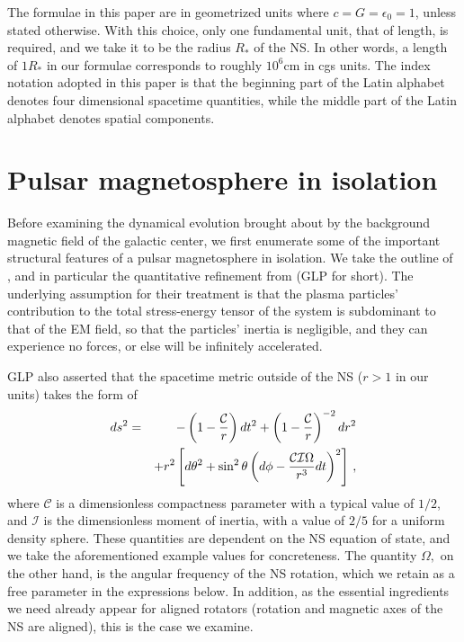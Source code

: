 \documentclass{aa}
\newcommand{\bea}{\begin{eqnarray}}
\newcommand{\eea}{\end{eqnarray}}
\begin{document}
The formulae in this paper are in geometrized units where $c=G=\epsilon_0=1$, unless stated otherwise. With this choice, only one fundamental unit, that of length, is required, and we take it to be the radius $R_*$ of the NS. In other words, a length of $1R_*$ in our formulae corresponds to roughly $10^6$cm in cgs units. The index notation adopted in this paper is that the beginning part of the Latin alphabet denotes four dimensional spacetime quantities, while the middle part of the Latin alphabet denotes spatial components.

\section{Pulsar magnetosphere in isolation} \label{sec:Iso}
Before examining the dynamical evolution brought about by the background magnetic field of the galactic center, we first enumerate some of the important structural features of a pulsar magnetosphere in isolation. We take the outline of \cite{Goldreich:1969sb}, and in particular the quantitative refinement from \cite{2016arXiv160404625G} (GLP for short).
The underlying assumption for their treatment is that the plasma particles' contribution to the total stress-energy tensor of the system is subdominant to that of the EM field, so that the particles' inertia is negligible, and they can experience no forces, or else will be infinitely accelerated. 

GLP also asserted that the spacetime metric outside of the NS ($r>1$ in our units) takes the form of 
\bea
ds^2&=&-\left(1-\frac{\mathcal{C}}{r}\right) dt^2 + \left(1-\frac{\mathcal{C}}{r}\right)^{-2}dr^2 \notag 
\\&&+ r^2 \left[ d\theta^2 + \sin^2\theta\left(d\phi-\frac{\mathcal{C}\mathcal{I} \Omega}{r^3} dt\right)^2\right]\,,
\eea
where $\mathcal{C}$ is a dimensionless compactness parameter with a typical value of $1/2$, and $\mathcal{I}$ is the dimensionless moment of inertia, with a value of $2/5$ for a uniform density sphere. These quantities are dependent on the NS equation of state, and we take the aforementioned example values for concreteness. The quantity $\Omega,$ on the other hand, is the angular frequency of the NS rotation, which we retain as a free parameter in the expressions below. In addition, as the essential ingredients we need already appear for aligned rotators (rotation and magnetic axes of the NS are aligned), 
this is the case we examine. 
\end{document}
